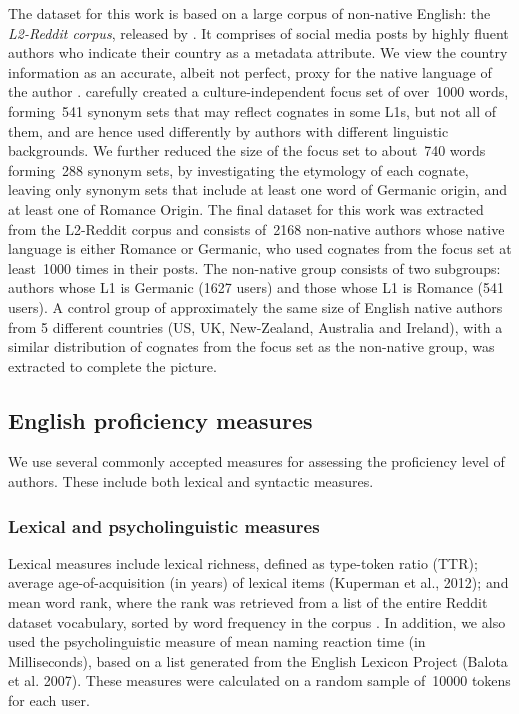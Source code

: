 \documentclass[11pt]{article}
\newcommand{\note}[1]{\textit{\small\color{magenta}{#1}}}
\begin{document}
The dataset for this work is based on a large corpus of non-native English: the \emph{L2-Reddit corpus}, released by \citet{TACL1403}. It comprises of social media posts by highly fluent authors who indicate their country as a metadata attribute.  We view the country information as an accurate, albeit not perfect, proxy for the native language of the author \citep{D18-1395}.  
\citet{TACL1403} carefully created  a culture-independent focus set of over~1000 words, forming~541 synonym sets that may reflect cognates in some L1s, but not all of them, and are hence used differently by authors with different linguistic backgrounds.
We further reduced the size of the focus set to about~740 words forming~288 synonym sets, by investigating the etymology of each cognate, leaving only synonym sets that include at least one word of Germanic origin, and at least one of Romance Origin.
The final dataset for this work was extracted from the L2-Reddit corpus and consists of~2168 non-native authors whose native language is either Romance or Germanic, who used cognates from the focus set at least~1000 times in their posts.
The non-native group consists of two subgroups:  authors whose L1 is Germanic (1627 users) and those whose L1 is Romance (541 users). 
A control group of approximately the same size of English native authors from 5 different countries (US, UK, New-Zealand, Australia and Ireland), with a similar distribution of cognates from the focus set as the non-native group, was extracted to complete the picture. 

\subsection{English proficiency measures}

We use several commonly accepted measures for assessing the proficiency level of authors. These include both lexical and syntactic measures.

\subsubsection{Lexical and psycholinguistic measures}

Lexical measures include lexical richness, defined as type-token ratio (TTR); average age-of-acquisition (in years) of lexical items (Kuperman et al., 2012); \note{fix ref} and mean word rank, where the rank was retrieved from a list of the entire Reddit dataset vocabulary, sorted by word frequency in the corpus \citep{TACL1403}.  In addition, we also used the psycholinguistic measure of mean naming reaction time (in Milliseconds), based on a list generated from the English Lexicon Project (Balota et al. 2007). \note{fix ref}
These measures were calculated on a random sample of~10000 tokens for each user.
\end{document}
